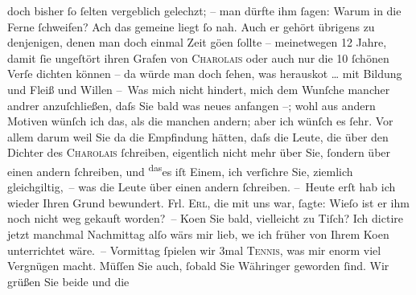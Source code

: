 \begin{ledgroupsized}[t]{13cm}
               doch bisher ſo ſelten vergeblich gelechzt; – man dürfte ihm ſagen: Warum in die Ferne
               ſchweifen? Ach das gemeine liegt ſo nah. Auch er gehört übrigens zu denjenigen, denen
               man doch einmal Zeit gö{\geminationn}en ſollte – meinetwegen 12
               Jahre, damit ſie ungeſtört ihren Grafen von \textsc{Charolais} oder auch nur die 10 ſchönen Verſe dichten können – da{\geminationn} würde man doch {\pb}ſehen,
               was herausko{\geminationm}t {\dots} mit Bildung
               und Fleiß und Willen {\dotsfour}\pend
           \pstart
           – Was mich nicht hindert, mich dem Wunſche mancher andrer anzuſchließen, daſs Sie
               bald was neues anfangen –; wohl aus andern Motiven wünſch ich das, als die manchen
               andern; aber ich wünſch es ſehr. Vor allem darum weil Sie da{\geminationn} die Empfindung hätten, daſs die Leute, die über den
               Dichter des \textsc{Charolais} ſchreiben, eigentlich nicht mehr über Sie, ſondern über {\pb}einen andern ſchreiben, und \substVorne{}\textsuperscript{das}\substDazwischen{}es\substHinten{} iſt Einem, ich
               verſichre Sie,  ziemlich gleichgiltig, – was die
               Leute über einen andern ſchreiben.\pend
           \pstart
           – Heute erſt hab ich wieder Ihren Grund bewundert. Frl. \textsc{Erl}, die mit uns war, ſagte: Wieſo ist er ihm noch nicht weg gekauft worden? –\pend
           \pstart
           Ko{\geminationm}en Sie bald, vielleicht zu Tiſch? Ich dictire jetzt
               manchmal Nachmittag alſo wärs mir lieb, we{\geminationn} ich früher
               von Ihrem Ko{\geminationm}en unterrichtet {\pb}wäre. – Vormittag ſpielen wir 3mal \textsc{Tennis}, was mir enorm viel Vergnügen macht. Müſſen Sie auch,
               ſobald Sie Währinger geworden ſind.\pend
           \pstart
           Wir grüßen Sie beide und die

\end{ledgroupsized}
